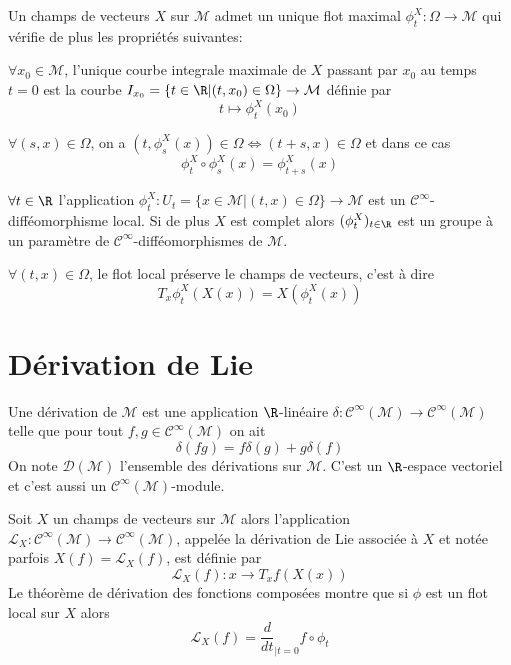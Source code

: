 \begin{pro}
Un champs de vecteurs $X$ sur $\mathcal{M}$ admet un unique flot maximal $\phi_t^X : \Omega \to \mathcal{M}$ qui vérifie de plus les propriétés suivantes:
\be
	\item $\forall x_0\in \mathcal{M}$, l'unique courbe integrale maximale de $X$ passant par $x_0$ au temps $t=0$ est la courbe $I_{x_0} = \{t\in \R | (t, x_0) \in \Omega\} \to \mathcal{M}$ définie par
	$$t \mapsto \phi_t^X(x_0)$$

	\item $\forall (s, x)\in \Omega$, on a $(t, \phi_s^X(x)) \in \Omega \iff (t+s, x) \in \Omega$ et dans ce cas
	$$\phi_t^X \circ \phi_s^X(x) = \phi_{t+s}^X(x)$$

	\item $\forall t\in \R$ l'application $\phi_t^X : U_t = \{x\in \mathcal{M} | (t, x) \in \Omega \} \to \mathcal{M}$ est un $\mathscr{C}^\infty$-difféomorphisme local. Si de plus $X$ est complet alors $(\phi_t^X)_{t\in\R}$ est un groupe à un paramètre de $\mathscr{C}^\infty$-difféomorphismes de $\mathcal{M}$. 

	\item $\forall (t,x) \in \Omega$, le flot local préserve le champs de vecteurs, c'est à dire 
	$$T_x\phi_t^X(X(x)) = X(\phi_t^X(x))$$
\ee
\end{pro}

\newpage
\section{Dérivation de Lie}

\begin{defi}[Dérivation]
Une dérivation de $\mathcal{M}$ est une application $\R$-linéaire $\delta : \mathscr{C}^\infty(\mathcal{M}) \to \mathscr{C}^\infty(\mathcal{M})$ telle que pour tout $f, g \in \mathscr{C}^\infty(\mathcal{M})$ on ait
$$\delta(fg) = f\delta(g) + g\delta(f)$$
On note $\mathscr{D}(\mathcal{M})$ l'ensemble des dérivations sur $\mathcal{M}$. C'est un $\R$-espace vectoriel et c'est aussi un $\mathscr{C}^\infty(\mathcal{M})$-module.
\end{defi}

\begin{defi}
Soit $X$ un champs de vecteurs sur $\mathcal{M}$ alors l'application $\mathscr{L}_X: \mathscr{C}^\infty(\mathcal{M}) \to \mathscr{C}^\infty(\mathcal{M})$, appelée la dérivation de Lie associée à $X$ et notée parfois $X(f) = \mathscr{L}_X(f)$, est définie par 
$$\mathscr{L}_X(f): x\to T_xf(X(x))$$
Le théorème de dérivation des fonctions composées montre que si $\phi$ est un flot local sur $X$ alors
$$\mathscr{L}_X(f) = \frac{d}{dt}_{|t = 0}f\circ\phi_t$$
\end{defi}

